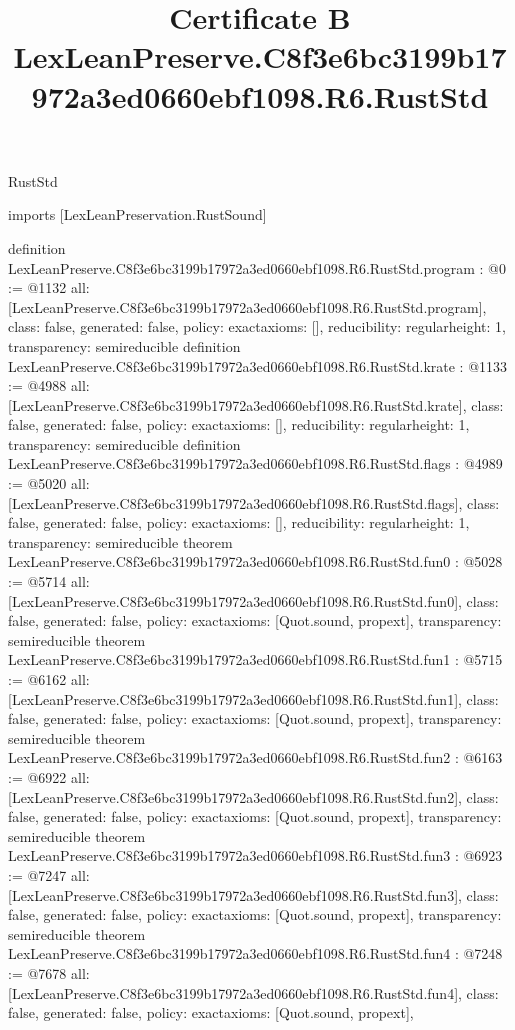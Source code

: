 \begin{lexlean}{RustStd}
\title{Certificate B LexLeanPreserve.C8f3e6bc3199b17972a3ed0660ebf1098.R6.RustStd}
\begin{coremodule}
imports [LexLeanPreservation.RustSound]

definition LexLeanPreserve.C8f3e6bc3199b17972a3ed0660ebf1098.R6.RustStd.program : @0 := @1132 {
  all: [LexLeanPreserve.C8f3e6bc3199b17972a3ed0660ebf1098.R6.RustStd.program],
  class: false,
  generated: false,
  policy: exact{axioms: []},
  reducibility: regular{height: 1},
  transparency: semireducible
}
definition LexLeanPreserve.C8f3e6bc3199b17972a3ed0660ebf1098.R6.RustStd.krate : @1133 := @4988 {
  all: [LexLeanPreserve.C8f3e6bc3199b17972a3ed0660ebf1098.R6.RustStd.krate],
  class: false,
  generated: false,
  policy: exact{axioms: []},
  reducibility: regular{height: 1},
  transparency: semireducible
}
definition LexLeanPreserve.C8f3e6bc3199b17972a3ed0660ebf1098.R6.RustStd.flags : @4989 := @5020 {
  all: [LexLeanPreserve.C8f3e6bc3199b17972a3ed0660ebf1098.R6.RustStd.flags],
  class: false,
  generated: false,
  policy: exact{axioms: []},
  reducibility: regular{height: 1},
  transparency: semireducible
}
theorem LexLeanPreserve.C8f3e6bc3199b17972a3ed0660ebf1098.R6.RustStd.fun0 : @5028 := @5714 {
  all: [LexLeanPreserve.C8f3e6bc3199b17972a3ed0660ebf1098.R6.RustStd.fun0],
  class: false,
  generated: false,
  policy: exact{axioms: [Quot.sound, propext]},
  transparency: semireducible
}
theorem LexLeanPreserve.C8f3e6bc3199b17972a3ed0660ebf1098.R6.RustStd.fun1 : @5715 := @6162 {
  all: [LexLeanPreserve.C8f3e6bc3199b17972a3ed0660ebf1098.R6.RustStd.fun1],
  class: false,
  generated: false,
  policy: exact{axioms: [Quot.sound, propext]},
  transparency: semireducible
}
theorem LexLeanPreserve.C8f3e6bc3199b17972a3ed0660ebf1098.R6.RustStd.fun2 : @6163 := @6922 {
  all: [LexLeanPreserve.C8f3e6bc3199b17972a3ed0660ebf1098.R6.RustStd.fun2],
  class: false,
  generated: false,
  policy: exact{axioms: [Quot.sound, propext]},
  transparency: semireducible
}
theorem LexLeanPreserve.C8f3e6bc3199b17972a3ed0660ebf1098.R6.RustStd.fun3 : @6923 := @7247 {
  all: [LexLeanPreserve.C8f3e6bc3199b17972a3ed0660ebf1098.R6.RustStd.fun3],
  class: false,
  generated: false,
  policy: exact{axioms: [Quot.sound, propext]},
  transparency: semireducible
}
theorem LexLeanPreserve.C8f3e6bc3199b17972a3ed0660ebf1098.R6.RustStd.fun4 : @7248 := @7678 {
  all: [LexLeanPreserve.C8f3e6bc3199b17972a3ed0660ebf1098.R6.RustStd.fun4],
  class: false,
  generated: false,
  policy: exact{axioms: [Quot.sound, propext]},
}
\end{coremodule}
\end{lexlean}
